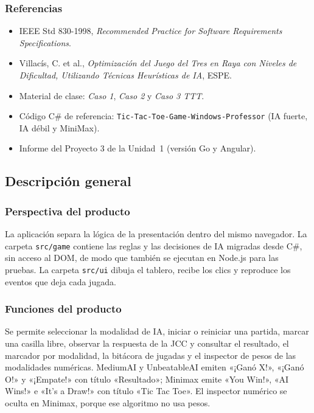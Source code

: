 \documentclass[12pt,a4paper]{article}
\begin{document}
\subsubsection{Referencias}
\begin{itemize}
  \item IEEE Std 830-1998, \emph{Recommended Practice for Software Requirements Specifications}.
  \item Villacís, C. et al., \emph{Optimización del Juego del Tres en Raya con
        Niveles de Dificultad, Utilizando Técnicas Heurísticas de IA}, ESPE.
  \item Material de clase: \emph{Caso 1}, \emph{Caso 2} y \emph{Caso 3 TTT}.
  \item Código C\# de referencia: \texttt{Tic-Tac-Toe-Game-Windows-Professor} (IA fuerte, IA débil y MiniMax).
  \item Informe del Proyecto 3 de la Unidad~1 (versión Go y Angular).
\end{itemize}

\subsection{Descripción general}

\subsubsection{Perspectiva del producto}
La aplicación separa la lógica de la presentación dentro del mismo navegador.
La carpeta \texttt{src/game} contiene las reglas y las decisiones de IA migradas
desde C\#, sin acceso al DOM, de modo que también se ejecutan en Node.js para
las pruebas. La carpeta \texttt{src/ui} dibuja el tablero, recibe los clics y
reproduce los eventos que deja cada jugada.

\subsubsection{Funciones del producto}
Se permite seleccionar la modalidad de IA, iniciar o reiniciar una partida,
marcar una casilla libre, observar la respuesta de la JCC y consultar el
resultado, el marcador por modalidad, la bitácora de jugadas y el inspector de
pesos de las modalidades numéricas. MediumAI y UnbeatableAI emiten «¡Ganó X!»,
«¡Ganó O!» y «¡Empate!» con título «Resultado»; Minimax emite «You Win!»,
«AI Wins!» e «It's a Draw!» con título «Tic Tac Toe». El inspector numérico se
oculta en Minimax, porque ese algoritmo no usa pesos.
\end{document}

